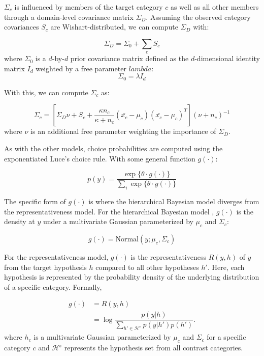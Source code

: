 \documentclass[12pt]{article} \usepackage[letterpaper, margin=1in,
\begin{document}
$\Sigma_c$ is influenced by members of the target category $c$ as well as all
other members through a domain-level covariance matrix $\Sigma_D$. Assuming the
observed category covariances $S_c$ are Wishart-distributed, we can compute $\Sigma_D$
with:

\begin{equation}
  \Sigma_D = \Sigma_0 + \sum_{c}{S_c}
\end{equation}
where $\Sigma_0$ is a $d$-by-$d$ prior covariance matrix defined as the
$d$-dimensional identity matrix $I_d$ weighted by a free parameter $lambda$:
\begin{equation}
    \Sigma_0 =  \lambda I_d
\end{equation}

With this, we can compute $\Sigma_c$ as:

\begin{equation}
  \Sigma_c = [\Sigma_D\nu + S_c +
    \dfrac
    {\kappa n_c}
    {\kappa + n_c}
    (\bar{x_c}-\mu_c)(\bar{x_c}-\mu_c)^T
  ] (\nu + n_c)^{-1}
  \label{eq:Sigma_c}
\end{equation}
where $\nu$ is an additional free parameter weighting the importance of
$\Sigma_D$.

As with the other models, choice probabilities are computed using the
exponentiated Luce's choice rule. With some general function $g(\cdot)$:

\begin{equation}\label{eq:hierLuce}
p(y) = \dfrac
{ \exp  \{ \theta \cdot g(\cdot) \} } 
{ \sum_i{ \exp \{ \theta \cdot g(\cdot) \}  } }
\end{equation}

The specific form of $g(\cdot)$ is where the hierarchical Bayesian model
diverges from the representativeness model. For the hierarchical Bayesian model
, $g(\cdot)$ is the density at $y$ under a multivariate Gaussian
parameterized by $\mu_c$ and $\Sigma_c$:

\begin{equation}\label{eq:hierg}
g(\cdot) = \textrm{Normal}(y;\mu_c,\Sigma_c)
\end{equation}

For the representativeness model, $g(\cdot)$ is the representativeness
$R(y,h)$ of $y$ from the target hypothesis $h$ compared to all other hypotheses
$h'$. Here, each hypothesis is represented by the probability density of the
underlying distribution of a specific category. Formally, 

\begin{align}
g(\cdot) & = R(y,h)\\
      & = \log \dfrac{p(y|h)}{\sum_{h'\in \mathcal{H}^c}{p(y|h')p(h')}} . 
\label{representativeness}
\end{align}
where $h_c$ is a multivariate Gaussian parameterized by $\mu_c$ and $\Sigma_c$
for a specific category $c$ and $\mathcal{H^c}$ represents the hypothesis set
from all contrast categories.
\end{document}
